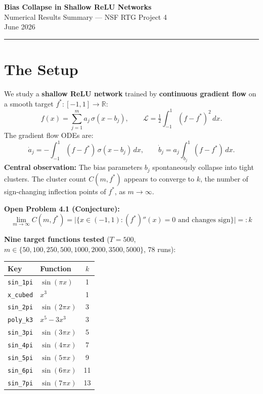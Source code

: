 \documentclass[11pt, letterpaper]{article}
\begin{document}
\begin{center}
  {\LARGE\bfseries\color{darkblue} Bias Collapse in Shallow ReLU Networks}\\[4pt]
  {\large Numerical Results Summary --- NSF RTG Project 4}\\[2pt]
  {\small June 2026}
\end{center}

\hrule\vspace{6pt}

\section*{The Setup}

We study a \textbf{shallow ReLU network} trained by \textbf{continuous gradient flow} on a
smooth target $f^*:[-1,1]\to\mathbb{R}$:
\[
  f(x) = \sum_{j=1}^{m} a_j\,\sigma(x - b_j),
  \qquad
  \mathcal{L} = \tfrac{1}{2}\int_{-1}^{1}(f - f^*)^2\,dx.
\]
The gradient flow ODEs are:
\[
  \dot{a}_j = -\int_{-1}^{1}(f-f^*)\,\sigma(x-b_j)\,dx,
  \qquad
  \dot{b}_j = a_j \int_{b_j}^{1}(f-f^*)\,dx.
\]
\textbf{Central observation:} The bias parameters $b_j$ spontaneously collapse into tight
clusters. The cluster count $C(m, f^*)$ appears to converge to $k$, the number of
sign-changing inflection points of $f^*$, as $m\to\infty$.

\textbf{Open Problem 4.1 (Conjecture):}
\[
  \lim_{m\to\infty} C(m, f^*) = \bigl|\{x\in(-1,1) : (f^*)''(x)=0\text{ and changes sign}\}\bigr| =: k
\]

\vspace{2pt}
\textbf{Nine target functions tested} ($T=500$, $m\in\{50,100,250,500,1000,2000,3500,5000\}$,
78 runs):

\begin{center}
\begin{tabular}{llc}
\toprule
Key & Function & $k$ \\
\midrule
\texttt{sin\_1pi} & $\sin(\pi x)$ & 1 \\
\texttt{x\_cubed} & $x^3$ & 1 \\
\texttt{sin\_2pi} & $\sin(2\pi x)$ & 3 \\
\texttt{poly\_k3} & $x^5 - 3x^3$ & 3 \\
\texttt{sin\_3pi} & $\sin(3\pi x)$ & 5 \\
\texttt{sin\_4pi} & $\sin(4\pi x)$ & 7 \\
\texttt{sin\_5pi} & $\sin(5\pi x)$ & 9 \\
\texttt{sin\_6pi} & $\sin(6\pi x)$ & 11 \\
\texttt{sin\_7pi} & $\sin(7\pi x)$ & 13 \\
\bottomrule
\end{tabular}
\end{center}
\end{document}
